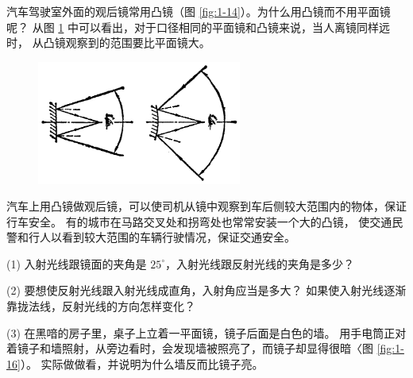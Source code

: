 汽车驾驶室外面的观后镜常用凸镜（图 \ref{fig:1-14}）。为什么用凸镜而不用平面镜呢？
从图 \ref{fig:1-15} 中可以看出，对于口径相同的平面镜和凸镜来说，当人离镜同样远时，
从凸镜观察到的范围要比平面镜大。
\begin{figure}[htbp]
    \centering
    \includegraphics[width=0.6\textwidth]{../pic/czwl2-ch1-15}
    \caption{}\label{fig:1-15}
\end{figure}
汽车上用凸镜做观后镜，可以使司机从镜中观察到车后侧较大范围内的物体，保证行车安全。
有的城市在马路交叉处和拐弯处也常常安装一个大的凸镜，
使交通民警和行人以看到较大范围的车辆行驶情况，保证交通安全。


\lianxi

(1) 入射光线跟镜面的夹角是 $25^\circ$，入射光线跟反射光线的夹角是多少？

(2) 要想使反射光线跟入射光线成直角，入射角应当是多大？
如果使入射光线逐渐靠拢法线，反射光线的方向怎样变化？

(3) 在黑喑的房子里，桌子上立着一平面镜，镜子后面是白色的墙。
用手电筒正对着镜子和墙照射，从旁边看时，会发现墙被照亮了，而镜子却显得很暗〈图 \ref{fig:1-16}）。
实际做做看，并说明为什么墙反而比镜子亮。


